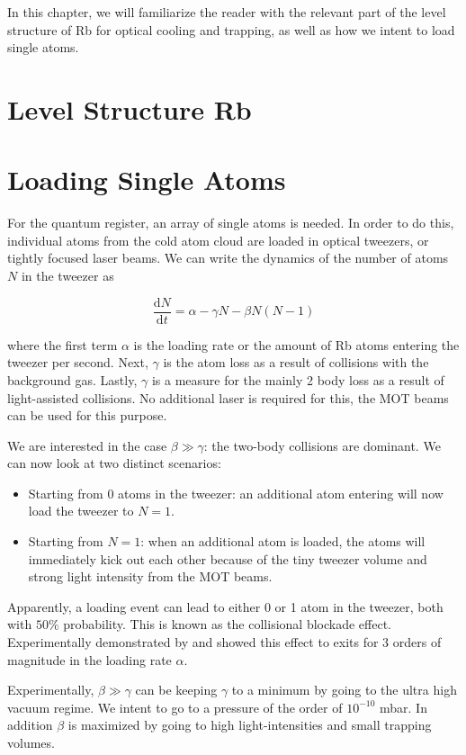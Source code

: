In this chapter, we will familiarize the reader with the relevant part of the level structure of Rb for optical cooling and trapping, as well as how we intent to load single atoms. 

\section{Level Structure Rb}


\section{Loading Single Atoms}

For the quantum register, an array of single atoms is needed. In order to do this, individual atoms from the cold atom cloud are loaded in optical tweezers, or tightly focused laser beams. We can write the dynamics of the number of atoms $N$ in the tweezer as \cite{Schlosser2002}

\begin{equation}\label{LoadingTweezer}
	\frac{\text{d}N}{\text{d}t} = \alpha - \gamma N - \beta N(N-1)
\end{equation}

where the first term $\alpha$ is the loading rate or the amount of Rb atoms entering the tweezer per second. Next, $\gamma$ is the atom loss as a result of collisions with the background gas. Lastly, $\gamma$ is a measure for the mainly 2 body loss as a result of light-assisted collisions. No additional laser is required for this, the MOT beams can be used for this purpose.  

We are interested in the case $\beta \gg \gamma$: the two-body collisions are dominant. We can now look at two distinct scenarios:

\begin{itemize}
	\item Starting from 0 atoms in the tweezer: an additional atom entering will now load the tweezer to $N=1$. 
	
	\item Starting from $N=1$: when an additional atom is loaded, the atoms will immediately kick out each other because of the tiny tweezer volume and strong light intensity from the MOT beams. 
\end{itemize}

Apparently, a loading event can lead to either 0 or 1 atom in the tweezer, both with $50\%$ probability. This is known as the collisional blockade effect. Experimentally demonstrated by \cite{Schlosser2001} and \cite{Schlosser2002} showed this effect to exits for 3 orders of magnitude in the loading rate $\alpha$.

Experimentally, $\beta \gg \gamma$ can be keeping $\gamma$ to a minimum by going to the ultra high vacuum regime. We intent to go to a pressure of the order of $10^{-10}$ mbar. In addition $\beta$ is maximized by going to high light-intensities and small trapping volumes. 